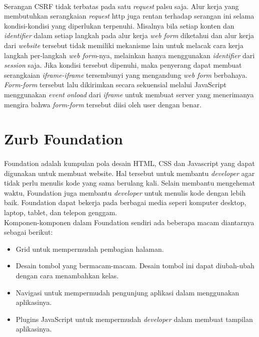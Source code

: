 \paragraph{}Serangan CSRF tidak terbatas pada satu \textit{request} palsu saja. Alur kerja yang membutuhkan serangkaian \textit{request} http juga rentan terhadap serangan ini selama kondisi-kondisi yang diperlukan terpenuhi. Misalnya bila setiap konten dan \textit{identifier} dalam setiap langkah pada alur kerja \textit{web form} diketahui dan alur kerja dari \textit{website} tersebut tidak memiliki mekanisme lain untuk melacak cara kerja langkah per-langkah \textit{web form}-nya, melainkan hanya menggunakan \textit{identifier} dari \textit{session} saja. Jika kondisi tersebut dipenuhi, maka penyerang dapat membuat serangkaian \textit{iframe-iframe} tersembunyi yang mengandung \textit{web form} berbahaya. \textit{Form-form} tersebut lalu dikirimkan secara sekuensial melalui JavaScript menggunakan \textit{event} \textit{onload} dari \textit{iframe} untuk membuat server yang menerimanya mengira bahwa \textit{form-form} tersebut diisi oleh user dengan benar. \cite{JohnsWinter2006}

\section{Zurb Foundation}
\label{zurbfoundation}

\paragraph{}  Foundation adalah kumpulan pola desain HTML, CSS dan Javascript yang dapat digunakan untuk membuat website. Hal tersebut untuk membantu \textit{developer} agar tidak perlu menulis kode yang sama berulang kali. Selain membantu mengehemat waktu, Foundation juga membantu \textit{developer} untuk menulis kode dengan lebih baik. Foundation dapat bekerja pada berbagai media seperi komputer desktop, laptop, tablet, dan telepon genggam.\cite{zurbfoundation:17} \\
Komponen-komponen dalam Foundation sendiri ada beberapa macam diantarnya sebagai berikut:

\begin{itemize}
	\item  Grid untuk mempermudah pembagian halaman.
	\item  Desain tombol yang bermacam-macam. Desain tombol ini dapat diubah-ubah dengan cara menambahkan kelas.
	\item  Navigasi untuk mempermudah pengunjung aplikasi dalam menggunakan aplikasinya.
	\item  Plugins JavaScript untuk mempermudah \textit{developer} dalam membuat tampilan aplikasinya.
\end{itemize}

